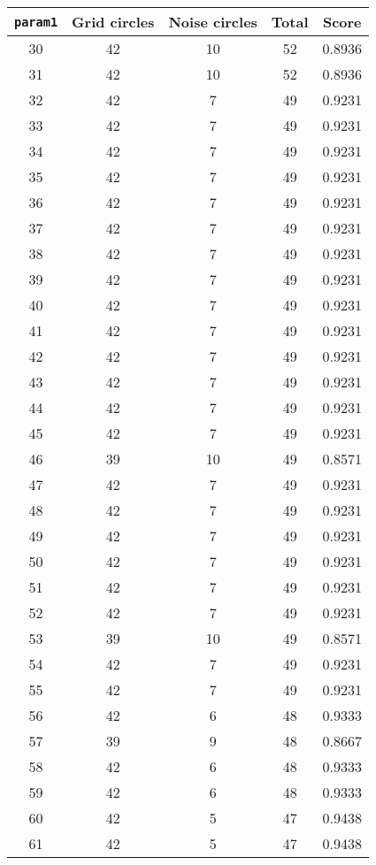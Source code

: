 \documentclass[letterpaper, 12pt]{article}
\begin{document}
\begin{longtable}{|c|c|c|c|c|}
\hline
\textbf{\texttt{param1}} & \textbf{Grid circles} & \textbf{Noise circles} & \textbf{Total} & \textbf{Score} \\
\hline
30 & 42 & 10 & 52 & 0.8936 \\
\hline
31 & 42 & 10 & 52 & 0.8936 \\
\hline
32 & 42 & 7 & 49 & 0.9231 \\
\hline
33 & 42 & 7 & 49 & 0.9231 \\
\hline
34 & 42 & 7 & 49 & 0.9231 \\
\hline
35 & 42 & 7 & 49 & 0.9231 \\
\hline
36 & 42 & 7 & 49 & 0.9231 \\
\hline
37 & 42 & 7 & 49 & 0.9231 \\
\hline
38 & 42 & 7 & 49 & 0.9231 \\
\hline
39 & 42 & 7 & 49 & 0.9231 \\
\hline
40 & 42 & 7 & 49 & 0.9231 \\
\hline
41 & 42 & 7 & 49 & 0.9231 \\
\hline
42 & 42 & 7 & 49 & 0.9231 \\
\hline
43 & 42 & 7 & 49 & 0.9231 \\
\hline
44 & 42 & 7 & 49 & 0.9231 \\
\hline
45 & 42 & 7 & 49 & 0.9231 \\
\hline
46 & 39 & 10 & 49 & 0.8571 \\
\hline
47 & 42 & 7 & 49 & 0.9231 \\
\hline
48 & 42 & 7 & 49 & 0.9231 \\
\hline
49 & 42 & 7 & 49 & 0.9231 \\
\hline
50 & 42 & 7 & 49 & 0.9231 \\
\hline
51 & 42 & 7 & 49 & 0.9231 \\
\hline
52 & 42 & 7 & 49 & 0.9231 \\
\hline
53 & 39 & 10 & 49 & 0.8571 \\
\hline
54 & 42 & 7 & 49 & 0.9231 \\
\hline
55 & 42 & 7 & 49 & 0.9231 \\
\hline
56 & 42 & 6 & 48 & 0.9333 \\
\hline
57 & 39 & 9 & 48 & 0.8667 \\
\hline
58 & 42 & 6 & 48 & 0.9333 \\
\hline
59 & 42 & 6 & 48 & 0.9333 \\
\hline
60 & 42 & 5 & 47 & 0.9438 \\
\hline
61 & 42 & 5 & 47 & 0.9438 \\

\end{longtable}
\end{document}
